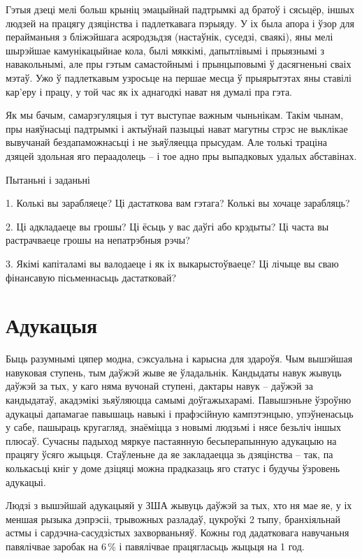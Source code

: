 Гэтыя дзеці мелі больш крыніц эмацыйнай падтрымкі ад братоў і сясьцёр, іншых людзей на працягу дзяцінства і падлеткавага пэрыяду. У іх была апора і ўзор для перайманьня з бліжэйшага асяродзьдзя (настаўнік, суседзі, сваякі), яны мелі шырэйшае камунікацыйнае кола, былі мяккімі, дапытлівымі і прыязнымі з навакольнымі, але пры гэтым самастойнымі і прынцыповымі ў дасягненьні сваіх мэтаў. Ужо ў падлеткавым узросьце на першае месца ў прыярытэтах яны ставілі кар'еру і працу, у той час як іх аднагодкі нават ня думалі пра гэта.

Як мы бачым, самарэгуляцыя і тут выступае важным чыньнікам. Такім чынам, пры наяўнасьці падтрымкі і актыўнай пазыцыі нават магутны стрэс не выклікае вывучанай бездапаможнасьці і не зьяўляецца прысудам. Але толькі траціна дзяцей здольная яго пераадолець – і тое адно пры выпадковых удалых абставінах.

Пытаньні і заданьні

1. Колькі вы зарабляеце? Ці дастаткова вам гэтага? Колькі вы хочаце зарабляць?

2. Ці адкладаеце вы грошы? Ці ёсьць у вас даўгі або крэдыты? Ці часта вы растрачваеце грошы на непатрэбныя рэчы?

3. Якімі капіталамі вы валодаеце і як іх выкарыстоўваеце? Ці лічыце вы сваю фінансавую пісьменнасьць дастатковай?


\section{Адукацыя}

Быць разумнымі цяпер модна, сэксуальна і карысна для здароўя. Чым вышэйшая навуковая ступень, тым даўжэй жыве яе ўладальнік. Кандыдаты навук жывуць даўжэй за тых, у каго няма вучонай ступені, дактары навук – даўжэй за кандыдатаў, акадэмікі зьяўляюцца самымі доўгажыхарамі. Павышэньне ўзроўню адукацыі дапамагае павышаць навыкі і прафэсійную кампэтэнцыю, упэўненасьць у сабе, пашыраць кругагляд, знаёміцца з новымі людзьмі і нясе безьліч іншых плюсаў. Сучасны падыход мяркуе пастаянную бесьперапынную адукацыю на працягу ўсяго жыцьця. Стаўленьне да яе закладаецца зь дзяцінства – так, па колькасьці кніг у доме дзіцяці можна прадказаць яго статус і будучы ўзровень адукацыі.

Людзі з вышэйшай адукацыяй у ЗША жывуць даўжэй за тых, хто ня мае яе, у іх меншая рызыка дэпрэсіі, трывожных разладаў, цукроўкі 2 тыпу, бранхіяльнай астмы і сардэчна-сасудзістых захворваньняў. Кожны год дадатковага навучаньня павялічвае заробак на 6\,\% і павялічвае працягласьць жыцьця на 1 год.

